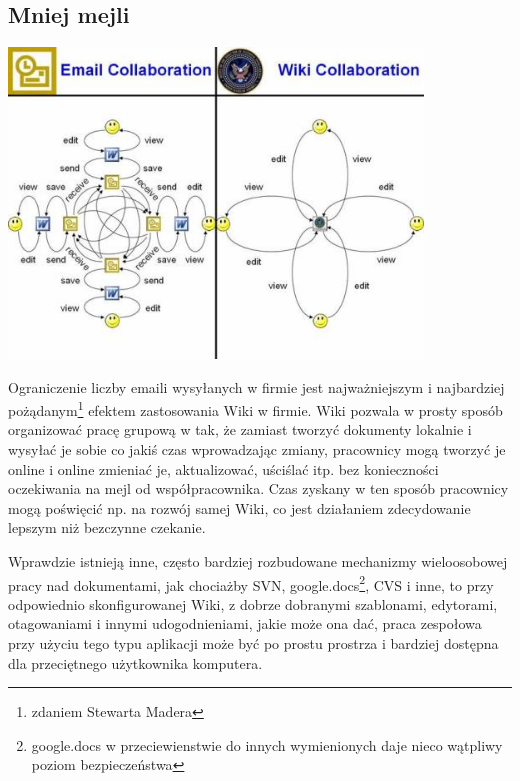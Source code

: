 \documentclass{article}
\begin{document}
	\subsection{Mniej mejli}
	\begin{center}
		\includegraphics[width=11cm]{screenshots/wiki_collaboration2.jpg}
	\end{center}
		Ograniczenie liczby emaili wysyłanych w firmie jest najważniejszym i najbardziej pożądanym\footnote{zdaniem Stewarta Madera} efektem zastosowania Wiki w firmie. Wiki pozwala w prosty sposób organizować pracę grupową w tak, że zamiast tworzyć dokumenty lokalnie i wysyłać je sobie co jakiś czas wprowadzając zmiany, pracownicy mogą tworzyć je online i online zmieniać je, aktualizować, uściślać itp. bez konieczności oczekiwania na mejl od współpracownika. Czas zyskany w ten sposób pracownicy mogą poświęcić np. na rozwój samej Wiki, co jest działaniem zdecydowanie lepszym niż bezczynne czekanie.

		Wprawdzie istnieją inne, często bardziej rozbudowane mechanizmy wieloosobowej pracy nad dokumentami, jak chociażby SVN, google.docs\footnote{google.docs w przeciewienstwie do innych wymienionych daje nieco wątpliwy poziom bezpieczeństwa}, CVS i inne, to przy odpowiednio skonfigurowanej Wiki, z dobrze dobranymi szablonami, edytorami, otagowaniami i innymi udogodnieniami, jakie może ona dać, praca zespołowa przy użyciu tego typu aplikacji może być po prostu prostrza i bardziej dostępna dla przeciętnego użytkownika komputera.
\end{document}
